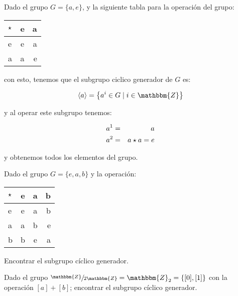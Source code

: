         \begin{ejemplo}
            Dado el grupo $G = \{a, e\}$, y la siguiente tabla para la operación del grupo:

            \begin{center}
                \begin{tabular}{l | c r}
                    $\star$ & e & a \\
                    \hline
                    e & e & a \\
                    a & a & e
                \end{tabular}
            \end{center}

            con esto, tenemos que el subgrupo ciclico generador de $G$ es:

            \begin{equation*}
                \langle a \rangle = \left\{ a^i \in G \mid i \in \mathbbm{Z} \right\}
            \end{equation*}

            y al operar este subgrupo tenemos:

            \begin{eqnarray*}
                a^1 & = & a  \\
                a^2 & = & a \star a = e
            \end{eqnarray*}

            y obtenemos todos los elementos del grupo.
        \end{ejemplo}

        \begin{ejercicio}
            Dado el grupo $G = \{e, a, b\}$ y la operación:

            \begin{center}
                \begin{tabular}{l | c c r}
                    $\star$ & e & a & b \\
                    \hline
                    e & e & a & b \\
                    a & a & b & e \\
                    b & b & e & a
                \end{tabular}
            \end{center}

            Encontrar el subgrupo cíclico generador.
        \end{ejercicio}

        \begin{ejercicio}
            Dado el grupo $\sfrac{\mathbbm{Z}}{2\mathbbm{Z}} = \mathbbm{Z}_2 = \left\{ [0], [1] \right\}$ con la operación $[a] + [b]$; encontrar el subgrupo cíclico generador.
        \end{ejercicio}


